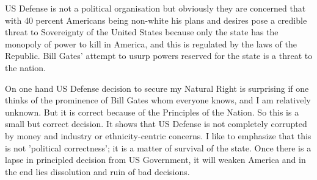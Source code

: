 \documentclass{amsart}
\begin{document}
US Defense is not a political organisation but obviously they are concerned that with 40 percent Americans being non-white his plans and desires pose a credible threat to Sovereignty of the United States because only the state has the monopoly of power to kill in America, and this is regulated by the laws of the Republic.  Bill Gates' attempt to usurp powers reserved for the state is a threat to the nation.

On one hand US Defense decision to secure my Natural Right is surprising if one thinks of the prominence of Bill Gates whom everyone knows, and I am relatively unknown.  But it is correct because of the Principles of the Nation.  So this is a small but correct decision.  It shows that US Defense is not completely corrupted by money and industry or ethnicity-centric concerns.  I like to emphasize that this is not 'political correctness'; it is a matter of survival of the state.  Once there is a lapse in principled decision from US Government, it will weaken America and in the end lies dissolution and ruin of bad decisions.
\end{document}
